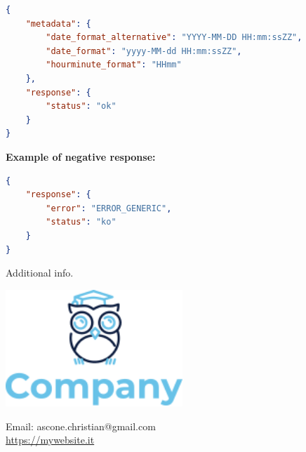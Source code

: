 \documentclass{scrreprt}
\begin{document}
\vspace{.2cm}


\begin{lstlisting}[language=json,firstnumber=1]
{
    "metadata": {
        "date_format_alternative": "YYYY-MM-DD HH:mm:ssZZ",
        "date_format": "yyyy-MM-dd HH:mm:ssZZ",
        "hourminute_format": "HHmm"
    },
    "response": {
        "status": "ok"
    }
}
\end{lstlisting}

\vspace{.2cm}

\textbf{Example of negative response:}
\begin{lstlisting}[language=json,firstnumber=1]
{
    "response": {
        "error": "ERROR_GENERIC",
        "status": "ko"
    }
}
\end{lstlisting}

\vspace{.5cm}

Additional info.

\clearpage


\clearpage
\begin{center}
\includegraphics[width=0.5\textwidth]{header.png}
\end{center}

    \begin{bfseries}\centering
        \vspace{5cm}
        \Huge{Email: ascone.christian@gmail.com\\}
        \vspace{1.3cm}
    \url{https://mywebsite.it}\\    
        \vspace{1.0cm}
        \vspace{1.5cm}
    \end{bfseries}

\end{document}
